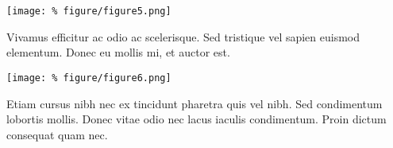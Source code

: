 \documentclass[unknownkeysallowed,usepdftitle=false, aspectratio=169, parskip=full]{beamer}
\newcommand{\secvariable}{nothing}
\newcommand{\mysection}[1]{\renewcommand{\secvariable}{#1}
}
\begin{document}
\mysection{major}
\begin{frame}\label{\secvariable} %
\begin{center}
\texttt{[image: \%
figure/figure5.png]}
\end{center}

    \parbox{\linewidth}{

Vivamus efficitur ac odio ac scelerisque. Sed tristique vel sapien euismod elementum. Donec eu mollis mi, et auctor est.
}
\end{frame}

\mysection{slab}
\begin{frame}\label{\secvariable}
\begin{center}
\texttt{[image: \%
figure/figure6.png]}
\end{center}
    \parbox{\linewidth}{

Etiam cursus nibh nec ex tincidunt pharetra quis vel nibh. Sed condimentum lobortis mollis. Donec vitae odio nec lacus iaculis condimentum. Proin dictum consequat quam nec. \hyperlink{slabtable}{}
}

\end{frame}
\end{document}
